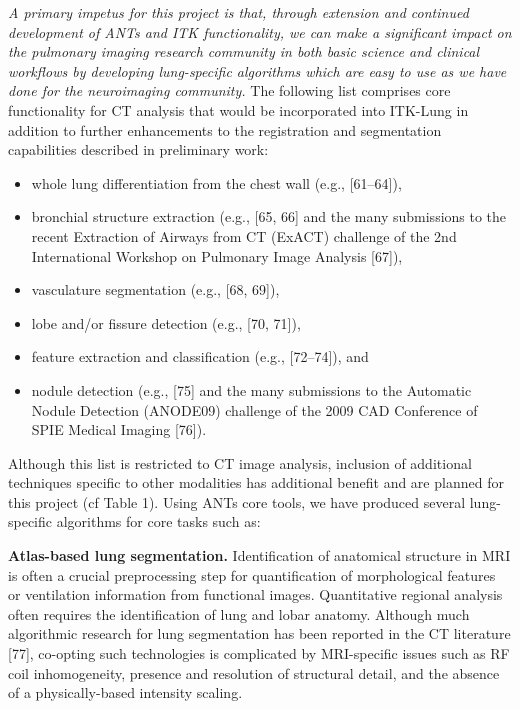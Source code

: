 \documentclass[11pt,]{article}
\providecommand{\tightlist}{%
  \setlength{\itemsep}{0pt}\setlength{\parskip}{0pt}}
\begin{document}
\emph{A primary impetus for this project is that, through extension and
continued development of ANTs and ITK functionality, we can make a
significant impact on the pulmonary imaging research community in both
basic science and clinical workflows by developing lung-specific
algorithms which are easy to use as we have done for the neuroimaging
community.} The following list comprises core functionality for CT
analysis that would be incorporated into ITK-Lung in addition to further
enhancements to the registration and segmentation capabilities described
in preliminary work:

\begin{itemize}
\tightlist
\item
  whole lung differentiation from the chest wall (e.g., {[}61--64{]}),
\item
  bronchial structure extraction (e.g., {[}65, 66{]} and the many
  submissions to the recent Extraction of Airways from CT (ExACT)
  challenge of the 2nd International Workshop on Pulmonary Image
  Analysis {[}67{]}),
\item
  vasculature segmentation (e.g., {[}68, 69{]}),
\item
  lobe and/or fissure detection (e.g., {[}70, 71{]}),
\item
  feature extraction and classification (e.g., {[}72--74{]}), and
\item
  nodule detection (e.g., {[}75{]} and the many submissions to the
  Automatic Nodule Detection (ANODE09) challenge of the 2009 CAD
  Conference of SPIE Medical Imaging {[}76{]}).
\end{itemize}

Although this list is restricted to CT image analysis, inclusion of
additional techniques specific to other modalities has additional
benefit and are planned for this project (cf Table 1). Using ANTs core
tools, we have produced several lung-specific algorithms for core tasks
such as:

\textbf{Atlas-based lung segmentation.} Identification of anatomical
structure in MRI is often a crucial preprocessing step for
quantification of morphological features or ventilation information from
functional images. Quantitative regional analysis often requires the
identification of lung and lobar anatomy. Although much algorithmic
research for lung segmentation has been reported in the CT literature
{[}77{]}, co-opting such technologies is complicated by MRI-specific
issues such as RF coil inhomogeneity, presence and resolution of
structural detail, and the absence of a physically-based intensity
scaling.
\end{document}
